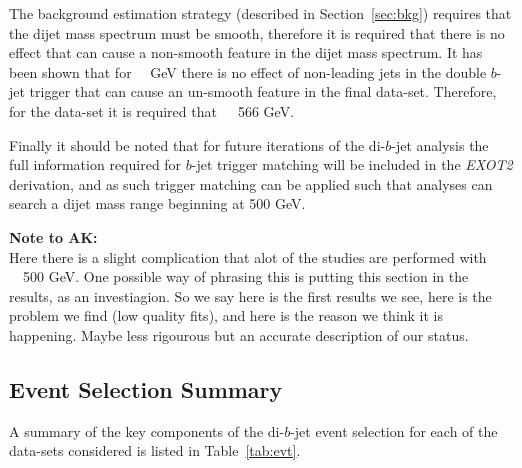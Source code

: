The background estimation strategy (described in Section~\ref{sec:bkg}) requires that the dijet mass spectrum must be smooth,
therefore it is required that there is no effect that can cause a non-smooth feature in the dijet mass spectrum.
It has been shown that for~\mjj~ GeV there is no effect of non-leading jets in the double $b$-jet trigger
that can cause an un-smooth feature in the final data-set.
Therefore, for the \lm{} data-set it is required that~\mjj~\gt~566 GeV.

Finally it should be noted that for future iterations of the di-$b$-jet analysis
the full information required for $b$-jet trigger matching will be included in the \textit{EXOT2} derivation,
and as such trigger matching can be applied such that analyses can search a dijet mass range beginning at 500 GeV.

\noindent
\textbf{Note to AK:}\\
Here there is a slight complication that alot of the studies are performed with \mjj{}~\gt{}~500 GeV.
One possible way of phrasing this is putting this section in the results, as an investiagion.
So we say here is the first results we see, here is the problem we find (low quality fits),
and here is the reason we think it is happening.
Maybe less rigourous but an accurate description of our status.

\newpage 
\subsection{Event Selection Summary}
\label{sec:evt-sel-acc}

A summary of the  key components of the di-$b$-jet event selection
for each of the data-sets considered
is listed in Table~\ref{tab:evt}.


